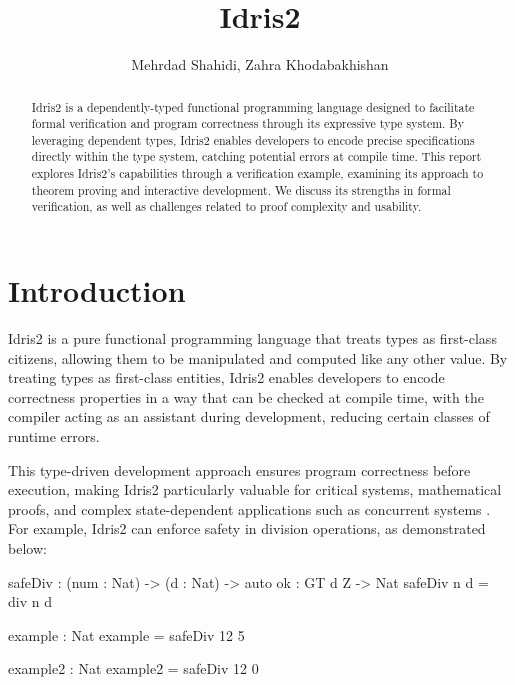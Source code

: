\documentclass[]{rptuseminar}
\title{Idris2}
\author{Mehrdad Shahidi, Zahra Khodabakhishan
  \institute{Rheinland-Pfälzische Technische Universität Kaiserslautern-Landau, Department of Computer Science}}
\begin{document}

\maketitle


\begin{abstract}
Idris2 is a dependently-typed functional programming language designed to facilitate formal verification and program correctness through its expressive type system. By leveraging dependent types, Idris2 enables developers to encode precise specifications directly within the type system, catching potential errors at compile time. This report explores Idris2's capabilities through a verification example, examining its approach to theorem proving and interactive development. We discuss its strengths in formal verification, as well as challenges related to proof complexity and usability.
\end{abstract}


\section{Introduction}
\label{sec:introduction}



Idris2 is a pure functional programming language that treats types as first-class citizens, allowing them to be manipulated and computed like any other value. By treating types as first-class entities, Idris2 enables developers to encode correctness properties in a way that can be checked at compile time, with the compiler acting as an assistant during development, reducing certain classes of runtime errors.

This type-driven development approach ensures program correctness before execution, making Idris2 particularly valuable for critical systems, mathematical proofs, and complex state-dependent applications such as concurrent systems \cite{brady2021idris}. For example, Idris2 can enforce safety in division operations, as demonstrated below:

\begin{idris}
safeDiv : (num : Nat) -> (d : Nat) -> {auto ok : GT d Z} -> Nat  
safeDiv n d  = div n d  

example : Nat  
example = safeDiv 12 5

example2 : Nat
example2 = safeDiv 12 0
\end{idris}
\end{document}
